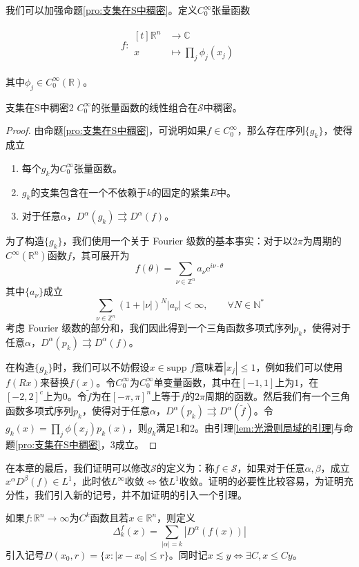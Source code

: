 \documentclass[lang = cn, %
scheme = chinese          %
]
{elegantbook}             %
\newcommand{\N}{\mathbb{N}}            %
\newcommand{\R}{\mathbb{R}}            %
\newcommand{\C}{\mathbb{C}}  		   %
\newcommand{\Z}{\mathbb{Z}}            %
\newcommand{\ee}[1]{\mathrm{e}^{#1}}           %
\newcommand{\dis}{\displaystyle}
\newcommand{\supp}{\text{supp }}
\newcommand{\function}[5]{
\begin{align*}
	#1:\begin{aligned}[t]
		#2 &\longrightarrow #3\\
		#4 &\longmapsto #5
	\end{aligned}
\end{align*}
}                                     %
\begin{document}
我们可以加强命题\ref{pro:支集在S中稠密}。定义$C_0^\infty$张量函数
\function{f}{\R^n}{\C}{x}{\prod_{j}\phi_j(x_j)}
其中$\phi_j\in C_0^\infty(\R)$。

\begin{proposition}{}{支集在S中稠密2}
	$C_0^\infty$的张量函数的线性组合在$\mathcal{S}$中稠密。
\end{proposition}

\begin{proof}
	由命题\ref{pro:支集在S中稠密}，可说明如果$f\in C_0^\infty$，那么存在序列$\{ g_k \}$，使得成立
	\begin{enumerate}
		\item 每个$g_k$为$C_0^\infty$张量函数。
		\item $g_k$的支集包含在一个不依赖于$k$的固定的紧集$E$中。
		\item 对于任意$\alpha$，$D^\alpha(g_k)\rightrightarrows D^\alpha(f)$。
	\end{enumerate}
	
	为了构造$\{ g_k \}$，我们使用一个关于 Fourier 级数的基本事实：对于以$2\pi$为周期的$C^\infty(\R^n)$函数$f$，其可展开为
	\[
	f(\theta)=\sum_{\nu\in\Z^n}a_{\nu}\ee{i\nu\cdot\theta}
	\]
	其中$\{ a_\nu \}$成立
	\[
	\sum_{\nu\in\Z^n}(1+|\nu|)^N|a_\nu|<\infty,\qquad \forall N\in\N^*
	\]
	考虑 Fourier 级数的部分和，我们因此得到一个三角函数多项式序列$p_k$，使得对于任意$\alpha$，$D^\alpha(p_k)\rightrightarrows D^\alpha(f)$。
	
	在构造$\{g_k\}$时，我们可以不妨假设$x\in\supp f$意味着$|x_j|\le 1$，例如我们可以使用$f(Rx)$来替换$f(x)$。令$C_0^\infty$为$C_0^\infty$单变量函数，其中在$[-1,1]$上为$1$，在$[-2,2]^c$上为$0$。令$\tilde{f}$为在$[-\pi,\pi]^n$上等于$f$的$2\pi $周期的函数。然后我们有一个三角函数多项式序列$p_k$，使得对于任意$\alpha$，$D^\alpha(p_k)\rightrightarrows D^\alpha(\tilde{f})$。令$\dis g_k(x)=\prod_j \phi(x_j)p_k(x)$，则$g_k$满足1和2。由引理\ref{lem:光滑则局域的引理}与命题\ref{pro:支集在S中稠密}，3成立。
\end{proof}

在本章的最后，我们证明可以修改$\mathcal{S}$的定义为：称$f\in\mathcal{S}$，如果对于任意$\alpha,\beta$，成立$x^\alpha D^\beta(f)\in L^1$，此时依$L^\infty$收敛$\iff$依$L^1$收敛。证明的必要性比较容易，为证明充分性，我们引入新的记号，并不加证明的引入一个引理。

如果$f:\R^n\to\infty$为$C^k$函数且若$x\in \R^n$，则定义
\[
\Delta_k^f(x)=\sum_{|\alpha|=k}|D^\alpha(f(x))|
\]
引入记号$D(x_0,r)=\{ x:|x-x_0|\le r \}$。同时记$x\lesssim y\iff \exists C,x\le Cy$。
\end{document}
